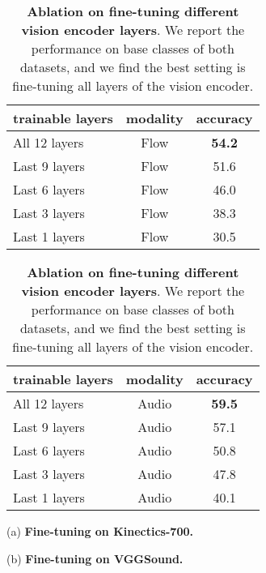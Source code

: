 \documentclass{article}
\begin{document}
\begin{table}[hbtp]
\begin{minipage}[t]{0.45\textwidth}
\centering
\begin{tabular}{lcc}
    \toprule 
    trainable layers & modality & accuracy \\
    \midrule 
    All 12 layers & Flow & \textbf{54.2} \\
    Last 9 layers & Flow & 51.6 \\
    Last 6 layers & Flow & 46.0 \\
    Last 3 layers & Flow & 38.3 \\
    Last 1 layers & Flow & 30.5 \\
    \bottomrule 
\end{tabular}
\end{minipage}
\hfill
\begin{minipage}[t]{0.45\textwidth}
\centering
\begin{tabular}{lcc}
    \toprule 
    trainable layers & modality & accuracy \\
    \midrule 
    All 12 layers & Audio & \textbf{59.5}\\
    Last 9 layers & Audio & 57.1 \\
    Last 6 layers & Audio & 50.8 \\
    Last 3 layers & Audio & 47.8 \\
    Last 1 layers & Audio & 40.1 \\
    \bottomrule 
\end{tabular}
\end{minipage}

\begin{minipage}[b]{0.45\textwidth}
\vspace{3pt}
\hspace{-40pt}
\centering
(a) \textbf{Fine-tuning on Kinectics-700.}
\end{minipage}
\begin{minipage}[b]{0.45\textwidth}
\vspace{3pt}
\hspace{40pt}
\centering
(b) \textbf{Fine-tuning on VGGSound.}
\end{minipage}

\caption{\textbf{Ablation on fine-tuning different vision encoder layers}. We report the performance on base classes of both datasets, and we find the best setting is fine-tuning all layers of the vision encoder.}
\label{tab:ablation_ft_layer}
\end{table}
\end{document}
